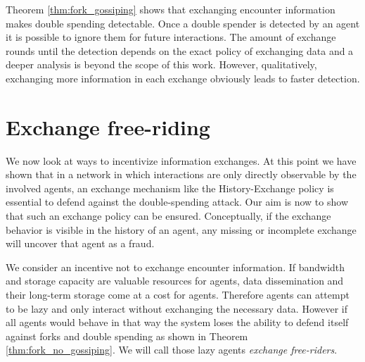 Theorem \ref{thm:fork_gossiping} shows that exchanging encounter information makes double spending detectable. Once a double
spender is detected by an agent it is possible to ignore them for future interactions. The amount 
of exchange rounds until the detection depends on the exact policy of exchanging data and a deeper 
analysis is beyond the scope of this work. However, qualitatively, exchanging more information in
each exchange obviously leads to faster detection.

\section{Exchange free-riding}
We now look at ways to incentivize information exchanges. At this point we have shown that in a network in which 
interactions are only directly observable by the involved agents, an exchange mechanism like the
History-Exchange policy is essential to defend against the double-spending attack. 
Our aim is now to show that such an exchange policy can be ensured. Conceptually, if the exchange 
behavior is visible in the history of an agent, any missing or incomplete exchange will uncover 
that agent as a fraud.

We consider an incentive not to exchange encounter information.
If bandwidth and storage capacity are valuable resources for agents, data dissemination and their 
long-term storage come at a cost for agents. Therefore agents can attempt to be lazy and only 
interact without exchanging the necessary data. 
However if all agents would behave in that way the system loses 
the ability to defend itself against forks and double spending as shown in Theorem 
\ref{thm:fork_no_gossiping}. We will call those lazy agents \textit{exchange free-riders}. 



